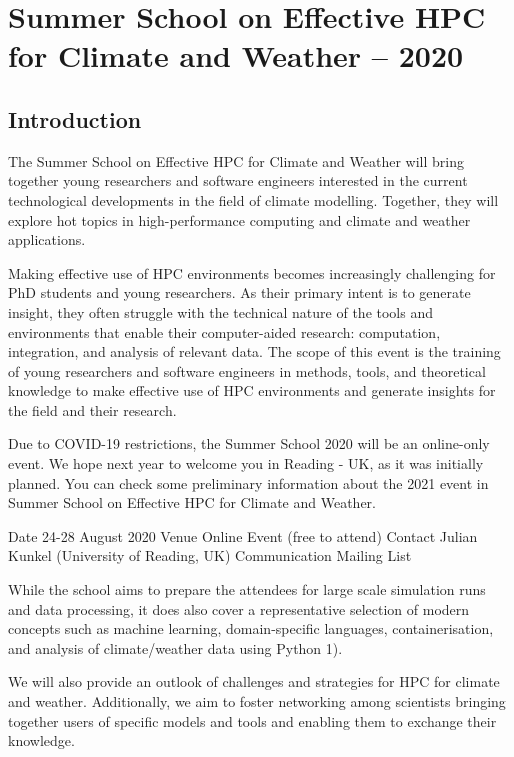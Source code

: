 \chapter{Summer School on Effective HPC for Climate and Weather -- 2020}
\label{ch:ss2020}

\section{Introduction}

The Summer School on Effective HPC for Climate and Weather will bring together young researchers and software engineers interested in the current technological developments in the field of climate modelling. Together, they will explore hot topics in high-performance computing and climate and weather applications.

Making effective use of HPC environments becomes increasingly challenging for PhD students and young researchers. As their primary intent is to generate insight, they often struggle with the technical nature of the tools and environments that enable their computer-aided research: computation, integration, and analysis of relevant data. The scope of this event is the training of young researchers and software engineers in methods, tools, and theoretical knowledge to make effective use of HPC environments and generate insights for the field and their research.

Due to COVID-19 restrictions, the Summer School 2020 will be an online-only event. We hope next year to welcome you in Reading - UK, as it was initially planned. You can check some preliminary information about the 2021 event in Summer School on Effective HPC for Climate and Weather.

Date	24-28 August 2020
Venue	Online Event (free to attend)
Contact	Julian Kunkel (University of Reading, UK)
Communication	Mailing List

While the school aims to prepare the attendees for large scale simulation runs and data processing, it does also cover a representative selection of modern concepts such as machine learning, domain-specific languages, containerisation, and analysis of climate/weather data using Python 1).

We will also provide an outlook of challenges and strategies for HPC for climate and weather. Additionally, we aim to foster networking among scientists bringing together users of specific models and tools and enabling them to exchange their knowledge.

